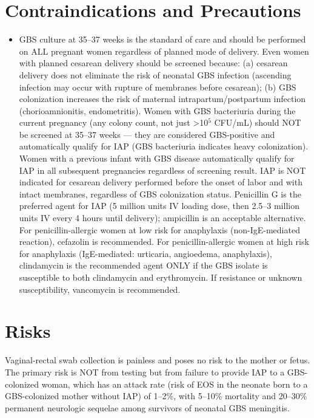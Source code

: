 \section*{Contraindications and Precautions}
\begin{itemize}
  \item GBS culture at 35--37 weeks is the standard of care and should be performed on ALL pregnant women regardless of planned mode of delivery. Even women with planned cesarean delivery should be screened because: (a) cesarean delivery does not eliminate the risk of neonatal GBS infection (ascending infection may occur with rupture of membranes before cesarean); (b) GBS colonization increases the risk of maternal intrapartum/postpartum infection (chorioamnionitis, endometritis). Women with GBS bacteriuria during the current pregnancy (any colony count, not just >10$^5$ CFU/mL) should NOT be screened at 35--37 weeks --- they are considered GBS-positive and automatically qualify for IAP (GBS bacteriuria indicates heavy colonization). Women with a previous infant with GBS disease automatically qualify for IAP in all subsequent pregnancies regardless of screening result. IAP is NOT indicated for cesarean delivery performed before the onset of labor and with intact membranes, regardless of GBS colonization status. Penicillin G is the preferred agent for IAP (5 million units IV loading dose, then 2.5--3 million units IV every 4 hours until delivery); ampicillin is an acceptable alternative. For penicillin-allergic women at low risk for anaphylaxis (non-IgE-mediated reaction), cefazolin is recommended. For penicillin-allergic women at high risk for anaphylaxis (IgE-mediated: urticaria, angioedema, anaphylaxis), clindamycin is the recommended agent ONLY if the GBS isolate is susceptible to both clindamycin and erythromycin. If resistance or unknown susceptibility, vancomycin is recommended.
\end{itemize}
\section*{Risks}
Vaginal-rectal swab collection is painless and poses no risk to the mother or fetus. The primary risk is NOT from testing but from failure to provide IAP to a GBS-colonized woman, which has an attack rate (risk of EOS in the neonate born to a GBS-colonized mother without IAP) of 1--2\%, with 5--10\% mortality and 20--30\% permanent neurologic sequelae among survivors of neonatal GBS meningitis.

